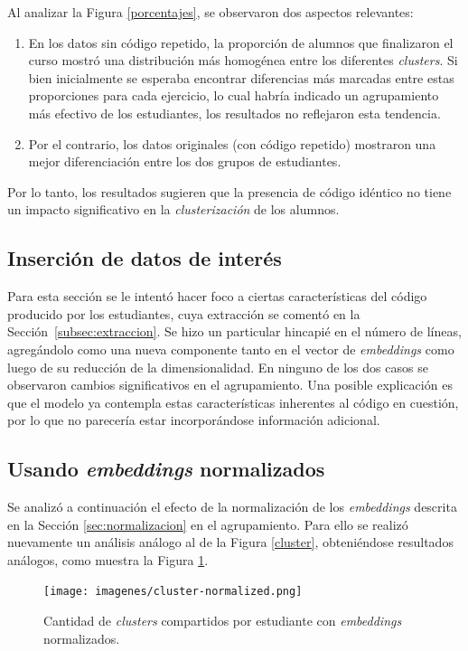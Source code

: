 \documentclass[11pt,a4paper,twoside,openany]{tesis}
\begin{document}
Al analizar la Figura \ref{porcentajes}, se observaron dos aspectos relevantes:
\begin{enumerate}
     \item En los datos sin código repetido, la proporción de alumnos que finalizaron el curso mostró una distribución más homogénea entre los diferentes \emph{clusters}. Si bien inicialmente se esperaba encontrar diferencias más marcadas entre estas proporciones para cada ejercicio, lo cual habría indicado un agrupamiento más efectivo de los estudiantes, los resultados no reflejaron esta tendencia.
     \item Por el contrario, los datos originales (con código repetido) mostraron una mejor diferenciación entre los dos grupos de estudiantes.
\end{enumerate}
Por lo tanto, los resultados sugieren que la presencia de código idéntico no tiene un impacto significativo en la \emph{clusterización} de los alumnos.

\subsection{Inserción de datos de interés}
Para esta sección se le intentó hacer foco a ciertas características del código producido por los estudiantes, cuya extracción se comentó en la Sección~\ref{subsec:extraccion}. Se hizo un particular hincapié en el número de líneas, agregándolo como una nueva componente tanto en el vector de \emph{embeddings} como luego de su reducción de la dimensionalidad. En ninguno de los dos casos se observaron cambios significativos en el agrupamiento. Una posible explicación es que el modelo ya contempla estas características inherentes al código en cuestión, por lo que no parecería estar incorporándose información adicional. 


\subsection{Usando \emph{embeddings} normalizados}

Se analizó a continuación el efecto de la normalización de los \emph{embeddings} descrita en la Sección \ref{sec:normalizacion} en el agrupamiento. Para ello se realizó nuevamente un análisis análogo al de la Figura \ref{cluster}, obteniéndose resultados análogos, como muestra la Figura \ref{normalizados}.

\begin{figure}[H]
    \centering
    \texttt{[image: imagenes/cluster-normalized.png]}
    \caption{Cantidad de \emph{clusters} compartidos por estudiante con \emph{embeddings} normalizados.}
    \label{normalizados}
\end{figure}
\end{document}
